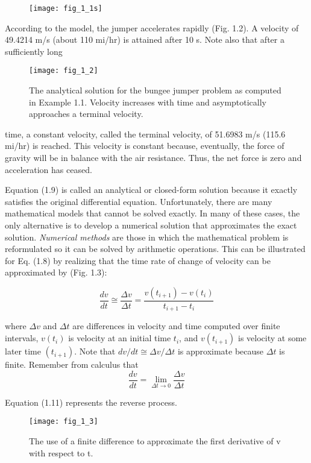 \documentclass[../main.tex]{subfiles}
\begin{document}
\begin{figure}[H]
	\centering
	\texttt{[image: fig\_1\_1s]}
   \label{fig:fig_1_1s}
\end{figure}



According to the model, the jumper accelerates rapidly (Fig. 1.2). A velocity of
49.4214 m/s (about 110 mi/hr) is attained after 10 s. Note also that after a sufficiently long

\begin{figure}[H]
	\centering
	\texttt{[image: fig\_1\_2]}
   \caption{\textsf{The analytical solution for the bungee jumper problem as computed in Example 1.1. Velocity
increases with time and asymptotically approaches a terminal velocity.}}
   \label{fig:fig_1_2}
\end{figure}

time, a constant velocity, called the terminal velocity, of 51.6983 m/s (115.6 mi/hr) is
reached. This velocity is constant because, eventually, the force of gravity will be in balance with the air resistance. Thus, the net force is zero and acceleration has ceased.


Equation (1.9) is called an analytical or closed-form solution because it exactly satisfies the original differential equation. Unfortunately, there are many mathematical models
that cannot be solved exactly. In many of these cases, the only alternative is to develop a
numerical solution that approximates the exact solution.
\textit{Numerical methods} are those in which the mathematical problem is reformulated so it
can be solved by arithmetic operations. This can be illustrated for Eq. (1.8) by realizing that
the time rate of change of velocity can be approximated by (Fig. 1.3):

\begin{equation}
\tag{1.11}
\dfrac{dv}{dt}\cong\dfrac{\Delta v}{\Delta t} = \dfrac{v(t_{i+1})-v(t_i)}{t_{i+1}-t_i}
\end{equation}

where $\Delta v$ and $\Delta t$ are differences in velocity and time computed over finite intervals, $v(t_i)$
is velocity at an initial time $t_i$, and $v(t_{i+1})$ is velocity at some later time $(t_{i+1})$. Note that
$dv/dt \cong \Delta v / \Delta t$ is approximate because $ \Delta t$ is finite. Remember from calculus that
$$
\dfrac{dv}{dt} = \lim_{\Delta t\to 0} \dfrac{\Delta v}{ \Delta t}
$$

Equation (1.11) represents the reverse process.

\begin{figure}[H]
	\centering
	\texttt{[image: fig\_1\_3]}
   \caption{\textsf{The use of a finite difference to approximate the first derivative of v with respect to t.}}
   \label{fig:fig_1_3}
\end{figure}
\end{document}
